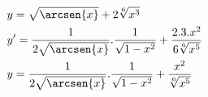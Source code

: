 \begin{ex}
\begin{align}
&y=\sqrt{\arcsen{x}}+2\sqrt[6]{x^3}\nonumber\\
&y'=\frac{1}{2\sqrt{\arcsen{x}}}.\frac{1}{\sqrt{1-x^2}}+\frac{2.3.x^2}{6\sqrt[6]{x^5}}\nonumber\\
&y=\frac{1}{2\sqrt{\arcsen{x}}}.\frac{1}{\sqrt{1-x^2}}+\frac{x^2}{\sqrt[6]{x^5}}\nonumber
\end{align}
\end{ex}